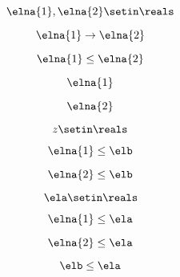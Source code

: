 \begin{forslides}
     \begin{equation}
        \label{eq:combination-131}
        \elna{1},\elna{2}\setin \reals
    \end{equation}
    
     \begin{equation}
        \label{eq:combination-132}
        \elna{1}\to \elna{2}
    \end{equation}
    
    \begin{equation}
        \label{eq:combination-133}
        \elna{1}\leq \elna{2}
    \end{equation}
    
     \begin{equation}
        \label{eq:combination-134}
        \elna{1}
    \end{equation}
    
     \begin{equation}
        \label{eq:combination-135}
        \elna{2}
    \end{equation}
    
    \begin{equation}
        \label{eq:combination-136}
        z\setin \reals
    \end{equation}
    
     \begin{equation}
        \label{eq:combination-137}
        \elna{1}\leq \elb
    \end{equation}
    
     \begin{equation}
        \label{eq:combination-138}
        \elna{2}\leq \elb
    \end{equation}
    
    \begin{equation}
        \label{eq:combination-139}
       \ela\setin \reals
    \end{equation}
    
       \begin{equation}
        \label{eq:combination-140}
        \elna{1}\leq \ela
    \end{equation}
       
     \begin{equation}
        \label{eq:combination-141}
        \elna{2}\leq \ela
    \end{equation}
    
     \begin{equation}
        \label{eq:combination-142}
        \elb\leq \ela
    \end{equation}
    

\end{forslides}
